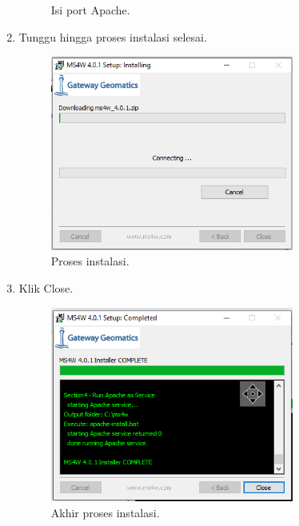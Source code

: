 \begin{enumerate}
\begin{figure}[H]
		\centering
		\caption{Isi port Apache.}
	\end{figure}
	\item  Tunggu hingga proses instalasi selesai.
	\hfill\break
	\begin{figure}[H]
		\includegraphics[width=8cm]{figures/Tugas4/1174074/7.png}
		\centering
		\caption{Proses instalasi.}
	\end{figure}
	\item  Klik Close.
	\hfill\break
	\begin{figure}[H]
		\includegraphics[width=8cm]{figures/Tugas4/1174074/8.png}
		\centering
		\caption{Akhir proses instalasi.}
	\end{figure}
\end{enumerate}
